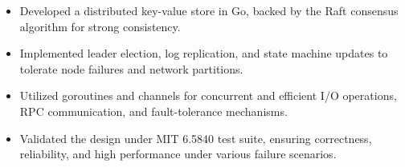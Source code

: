 


\begin{itemize}[nosep]
  \item Developed a distributed key-value store in Go, backed by the Raft consensus algorithm for strong consistency.
  \item Implemented leader election, log replication, and state machine updates to tolerate node failures and network partitions.
  \item Utilized goroutines and channels for concurrent and efficient I/O operations, RPC communication, and fault-tolerance mechanisms.
  \item Validated the design under MIT 6.5840 test suite, ensuring correctness, reliability, and high performance under various failure scenarios.
\end{itemize}
